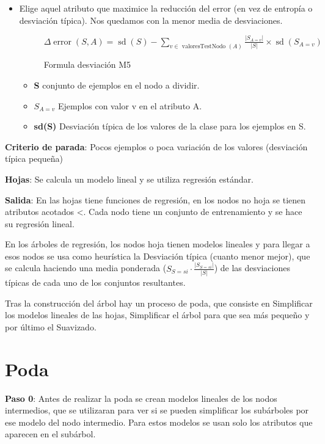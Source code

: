\documentclass[12pt, twoside, openright]{report} %
\begin{document}
\begin{itemize}
	\item Elige aquel atributo que maximice la reducción del error (en vez de entropía o desviación típica). Nos quedamos con la menor media de desviaciones.
	      \begin{figure}[H]
		      \(\Delta \operatorname{error}(S, A)=\operatorname{sd}(S)-\sum_{v \in \text { valoresTestNodo }(A)} \frac{\left|S_{A=v}\right|}{|S|} \times \operatorname{sd}\left(S_{A=v}\right)\)
		      \captionsetup{justification=centering}
		      \caption{Formula desviación M5}
	      \end{figure}

	      \begin{itemize}
		      \item \textbf{S} conjunto de ejemplos en el nodo a dividir.
		      \item \textbf{\(S_{A=v}\)} Ejemplos con valor v en el atributo A.
		      \item \textbf{sd(S)} Desviación típica de los valores de la clase para los ejemplos en S.
	      \end{itemize}
\end{itemize}

\textbf{Criterio de parada}: Pocos ejemplos o poca variación de los valores (desviación típica pequeña)

\textbf{Hojas}: Se calcula un modelo lineal y se utiliza regresión estándar.

\textbf{Salida}: En las hojas tiene funciones de regresión, en los nodos no hoja se tienen atributos acotados \textless. Cada nodo tiene un conjunto de entrenamiento y se hace su regresión lineal.

En los árboles de regresión, los nodos hoja tienen modelos lineales y para llegar a esos nodos se usa como heurística la Desviación típica (cuanto menor mejor), que se calcula haciendo una media ponderada (\(S_{S=si}\cdot\frac {|S_{S=si}|}{|S|}\)) de las desviaciones típicas de cada uno de los conjuntos resultantes.

Tras la construcción del árbol hay un proceso de poda, que consiste en Simplificar los modelos lineales de las hojas, Simplificar el árbol para que sea más pequeño y por último el Suavizado.

\section{Poda}

\textbf{Paso 0}: Antes de realizar la poda se crean modelos lineales de los nodos intermedios, que se utilizaran para ver si se pueden simplificar los subárboles por ese modelo del nodo intermedio. Para estos modelos se usan solo los atributos que aparecen en el subárbol.
\end{document}
